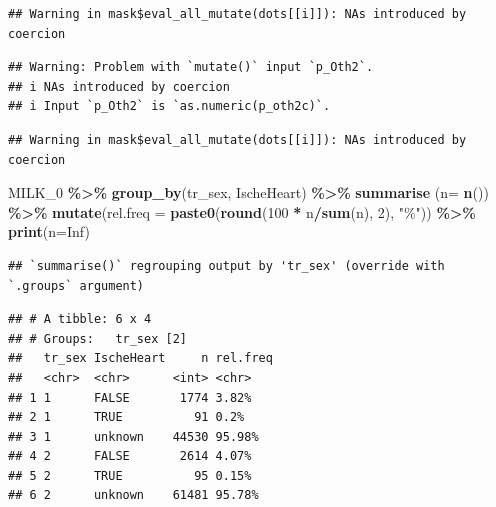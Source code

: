 \documentclass[
]{article}
\newenvironment{Shaded}{\begin{snugshade}}{\end{snugshade}}
\newcommand{\DataTypeTok}[1]{\textcolor[rgb]{0.13,0.29,0.53}{#1}}
\newcommand{\DecValTok}[1]{\textcolor[rgb]{0.00,0.00,0.81}{#1}}
\newcommand{\KeywordTok}[1]{\textcolor[rgb]{0.13,0.29,0.53}{\textbf{#1}}}
\newcommand{\NormalTok}[1]{#1}
\newcommand{\OperatorTok}[1]{\textcolor[rgb]{0.81,0.36,0.00}{\textbf{#1}}}
\newcommand{\OtherTok}[1]{\textcolor[rgb]{0.56,0.35,0.01}{#1}}
\newcommand{\StringTok}[1]{\textcolor[rgb]{0.31,0.60,0.02}{#1}}
\begin{document}
\begin{verbatim}
## Warning in mask$eval_all_mutate(dots[[i]]): NAs introduced by coercion
\end{verbatim}

\begin{verbatim}
## Warning: Problem with `mutate()` input `p_Oth2`.
## i NAs introduced by coercion
## i Input `p_Oth2` is `as.numeric(p_oth2c)`.
\end{verbatim}

\begin{verbatim}
## Warning in mask$eval_all_mutate(dots[[i]]): NAs introduced by coercion
\end{verbatim}

\begin{Shaded}
\begin{Highlighting}[]
\NormalTok{MILK\_}\DecValTok{0} \OperatorTok{\%\textgreater{}\%}\StringTok{ }
\StringTok{  }\KeywordTok{group\_by}\NormalTok{(tr\_sex, IscheHeart) }\OperatorTok{\%\textgreater{}\%}\StringTok{ }
\StringTok{  }\KeywordTok{summarise}\NormalTok{ (}\DataTypeTok{n=} \KeywordTok{n}\NormalTok{()) }\OperatorTok{\%\textgreater{}\%}
\StringTok{  }\KeywordTok{mutate}\NormalTok{(}\DataTypeTok{rel.freq =} \KeywordTok{paste0}\NormalTok{(}\KeywordTok{round}\NormalTok{(}\DecValTok{100} \OperatorTok{*}\StringTok{ }\NormalTok{n}\OperatorTok{/}\KeywordTok{sum}\NormalTok{(n), }\DecValTok{2}\NormalTok{), }\StringTok{"\%"}\NormalTok{))  }\OperatorTok{\%\textgreater{}\%}\StringTok{ }
\StringTok{  }\KeywordTok{print}\NormalTok{(}\DataTypeTok{n=}\OtherTok{Inf}\NormalTok{)}
\end{Highlighting}
\end{Shaded}

\begin{verbatim}
## `summarise()` regrouping output by 'tr_sex' (override with `.groups` argument)
\end{verbatim}

\begin{verbatim}
## # A tibble: 6 x 4
## # Groups:   tr_sex [2]
##   tr_sex IscheHeart     n rel.freq
##   <chr>  <chr>      <int> <chr>   
## 1 1      FALSE       1774 3.82%   
## 2 1      TRUE          91 0.2%    
## 3 1      unknown    44530 95.98%  
## 4 2      FALSE       2614 4.07%   
## 5 2      TRUE          95 0.15%   
## 6 2      unknown    61481 95.78%
\end{verbatim}
\end{document}
